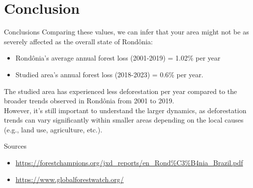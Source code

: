 \documentclass{beamer}
\begin{document}
\section{Conclusion}

\begin{frame}{Conclusions}
Comparing these values, we can infer that your area might not be as severely affected as the overall state of Rondônia:
    \begin{itemize}
        \item Rondônia's average annual forest loss (2001-2019) = 1.02\% per year
        \item Studied area’s annual forest loss (2018-2023) = 0.6\% per year.
    \end{itemize}
The studied area has experienced less deforestation per year compared to the broader trends observed in Rondônia from 2001 to 2019. \\However, it’s still important to understand the larger dynamics, as deforestation trends can vary significantly within smaller areas depending on the local causes (e.g., land use, agriculture, etc.).
\end{frame}

\begin{frame}{Sources}
    \begin{itemize}
        \item \url{https://forestchampions.org/jxd_reports/en_Rond\%C3\%B4nia_Brazil.pdf}
        \item \url{https://www.globalforestwatch.org/}
    \end{itemize}
\end{frame}
\end{document}

